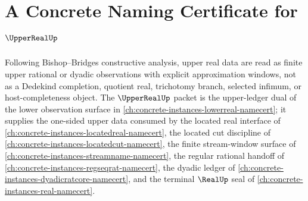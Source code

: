 \chapter{A Concrete Naming Certificate for $\UpperRealUp$}
\label{ch:concrete-instances-upperreal-namecert}

Following Bishop--Bridges constructive analysis, upper real data are read as finite upper rational or dyadic observations with explicit approximation windows, not as a Dedekind completion, quotient real, trichotomy branch, selected infimum, or host-completeness object. The $\UpperRealUp$ packet is the upper-ledger dual of the lower observation surface in \autoref{ch:concrete-instances-lowerreal-namecert}; it supplies the one-sided upper data consumed by the located real interface of \autoref{ch:concrete-instances-locatedreal-namecert}, the located cut discipline of \autoref{ch:concrete-instances-locatedcut-namecert}, the finite stream-window surface of \autoref{ch:concrete-instances-streamname-namecert}, the regular rational handoff of \autoref{ch:concrete-instances-regseqrat-namecert}, the dyadic ledger of \autoref{ch:concrete-instances-dyadicratcore-namecert}, and the terminal $\RealUp$ seal of \autoref{ch:concrete-instances-real-namecert}.

